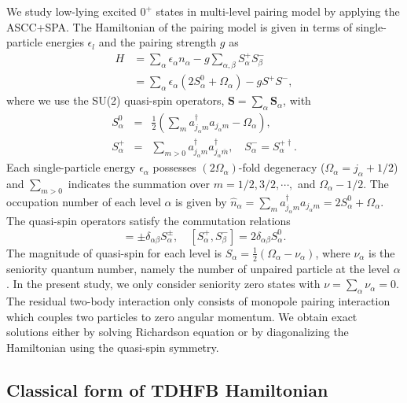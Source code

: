 \documentclass[%
superscriptaddress,
showpacs,
nofootinbib,
amsmath,amssymb,
aps,
prc,
twocolumn,
floatfix ]%
{revtex4-1}
\begin{document}
We study low-lying excited $0^+$ states
in multi-level pairing model by applying the ASCC+SPA.
The Hamiltonian of the pairing model is given in terms of
single-particle energies $\epsilon_l$ and the pairing strength $g$ as
\begin{align}
	H &= \sum_\alpha \epsilon_\alpha n_\alpha - g \sum_{\alpha,\beta} S_\alpha^+ S_{\beta}^- \nonumber \\
    &= \sum_\alpha\epsilon_\alpha(2S_\alpha^0+\Omega_\alpha) - g S^+ S^{-} ,
\end{align}
where we use the SU(2) quasi-spin operators,
$\boldsymbol{S}=\sum_\alpha \boldsymbol{S}_\alpha$, with
\begin{eqnarray}
        S_\alpha^0 &=& \frac{1}{2}(\sum_ma_{j_\alpha m}^{\dag}a_{j_\alpha m}-\Omega_\alpha) ,\\
        S_\alpha^{+} &=& \sum_{m>0}a_{j_\alpha m}^{\dag}a_{j_\alpha\overline{m}}^{\dag} ,
\quad   S_\alpha^{-} = S_\alpha^{+\dag} .
\end{eqnarray}
Each single-particle energy $\epsilon_\alpha$ possesses $(2\Omega_\alpha)$-fold
degeneracy ($\Omega_\alpha=j_\alpha+1/2$)
and $\sum_{m>0}$ indicates the summation over $m=1/2,3/2,\cdots,$
and $\Omega_\alpha-1/2$.
The occupation number of each level $\alpha$ is given by
$
\hat{n}_\alpha = \sum_m a^{\dag}_{j_\alpha m}a_{j_\alpha m}
=2S_\alpha^0+\Omega_\alpha
$.
The quasi-spin operators satisfy the commutation relations
\begin{equation}
  [S_\alpha^0,S_\beta^{\pm}] = \pm\delta_{\alpha\beta}S_{\alpha}^{\pm},
\quad [S_{\alpha}^{+},S_{\beta}^{-}] = 2\delta_{\alpha\beta}S_{\alpha}^{0} .
\end{equation}
The magnitude of quasi-spin for each level is
$S_\alpha=\frac{1}{2}(\Omega_\alpha-\nu_\alpha)$, where $\nu_\alpha$
is the seniority
quantum number, namely the number of unpaired particle at the level $\alpha$.
In the present study, we only consider seniority zero states with
$\nu=\sum_\alpha \nu_\alpha=0$.
The residual two-body interaction only consists of monopole pairing
interaction which couples two particles to zero angular momentum.
We obtain exact solutions either by solving Richardson equation
\cite{Richardson,Richardson2,Richardson3} or
by diagonalizing the Hamiltonian using the quasi-spin symmetry.


\subsection{Classical form of TDHFB Hamiltonian}
\end{document}
